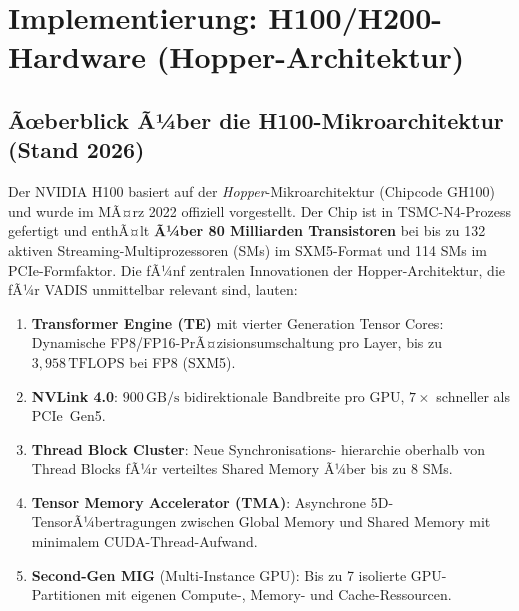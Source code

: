 ﻿\documentclass[12pt,a4paper]{article}
\begin{document}
\section{Implementierung: H100/H200-Hardware (Hopper-Architektur)}
\label{sec:nvidia}

\subsection{Ãœberblick Ã¼ber die H100-Mikroarchitektur (Stand 2026)}

Der NVIDIA H100 basiert auf der \emph{Hopper}-Mikroarchitektur
(Chipcode GH100) und wurde im MÃ¤rz 2022 offiziell vorgestellt.
Der Chip ist in TSMC-N4-Prozess gefertigt und enthÃ¤lt
\textbf{Ã¼ber 80 Milliarden Transistoren} bei bis zu 132 aktiven
Streaming-Multiprozessoren (SMs) im SXM5-Format und 114 SMs
im PCIe-Formfaktor. Die fÃ¼nf zentralen Innovationen der
Hopper-Architektur, die fÃ¼r VADIS unmittelbar relevant sind,
lauten:

\begin{enumerate}[leftmargin=1.4em, itemsep=2pt, topsep=4pt]
  \item \textbf{Transformer Engine (TE)} mit vierter Generation
        Tensor Cores: Dynamische FP8/FP16-PrÃ¤zisionsumschaltung
        pro Layer, bis zu $3{,}958\,\text{TFLOPS}$ bei FP8 (SXM5).
  \item \textbf{NVLink 4.0}: $900\,\text{GB/s}$ bidirektionale
        Bandbreite pro GPU, $7\times$ schneller als PCIe~Gen5.
  \item \textbf{Thread Block Cluster}: Neue Synchronisations-
        hierarchie oberhalb von Thread Blocks fÃ¼r
        verteiltes Shared Memory Ã¼ber bis zu 8 SMs.
  \item \textbf{Tensor Memory Accelerator (TMA)}: Asynchrone
        5D-TensorÃ¼bertragungen zwischen Global Memory und
        Shared Memory mit minimalem CUDA-Thread-Aufwand.
  \item \textbf{Second-Gen MIG} (Multi-Instance GPU):
        Bis zu 7 isolierte GPU-Partitionen mit eigenen
        Compute-, Memory- und Cache-Ressourcen.
\end{enumerate}
\end{document}
